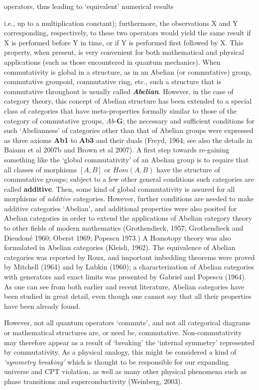 \documentclass[12pt]{article}
\theoremstyle{plain}
\theoremstyle{definition}
\theoremstyle{plain}
\numberwithin{equation}{section}
\begin{document}
operators, thus leading to `equivalent' numerical results {i.e., 
up to a multiplication constant); furthermore, the observations 
X and Y corresponding, respectively, to these two operators 
would yield the same result if X is performed before Y in time, 
or if Y is performed first followed by X.  This property, when present,
is very convenient for both mathematical and physical applications (such as those encountered in quantum mechanics). When commutativity is global in a structure, as in an Abelian (or commutative) group, commutative groupoid, commutative ring, etc., such a structure that is commutative throughout is usually called \textbf{\emph{Abelian}}. However, in the case of category theory, this concept of Abelian structure has been extended to a special class of categories that have meta-properties formally similar to those of the category of commutative groups, \emph{Ab}-\textbf{G}; the necessary and sufficient conditions for such `Abelianness' of categories other than that of Abelian groups were expressed as three axioms \textbf{Ab1} to \textbf{Ab3 } and their duals (Freyd, 1964; see also the details in Baianu et al 2007b and Brown et al 2007).  A first step towards re-gaining something like the `global commutativity' of an Abelian group is to require that all classes of morphisms $[A,B]$ or $Hom(A,B)$ have the structure of commutative groups; subject to a few other general conditions such categories are called \textbf{additive}. Then, some kind of global commutativity is assured for all morphisms of \emph{additive } categories. However, further conditions are needed to make additive categories `Abelian', and additional properties were also posited for Abelian categories in order to extend the applications of Abelian category theory to other fields of modern mathematics (Grothendieck, 1957; Grothendieck and Dieudon\'{e} 1960; Oberst 1969; Popescu 1973.) A Homotopy theory was also formulated in Abelian categories (Kleisli, 1962).  The equivalence of Abelian categories was reported by Roux, and important imbedding theorems were proved by Mitchell (1964) and by Lubkin (1960); a characterization of Abelian categories with generators and exact limits was presented by Gabriel and Popescu (1964). As one can see from both earlier and recent literature, Abelian categories have been studied in great detail, even though one cannot say that all their properties have been already found. 

 However, not all quantum operators `commute', and not all categorical diagrams or mathematical structures are, or need be, commutative. Non-commutativity may therefore appear as a result of `breaking' the `internal symmetry' represented by commutativity. As a physical analogy, this might be considered a kind of \emph{`symmetry breaking'} which is thought to be responsible for our expanding universe and CPT violation, as well as many other physical phenomena such as phase transitions and superconductivity (Weinberg, 2003). 

}
\end{document}

